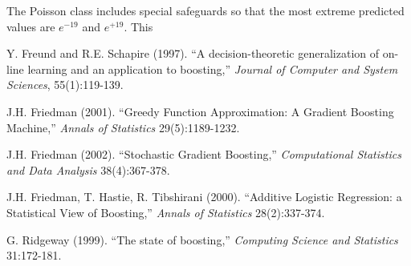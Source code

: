 \documentclass{article}
\begin{document}
The Poisson class includes special safeguards so that the most extreme predicted values are $e^{-19}$ and $e^{+19}$. This

\begin{thebibliography}{77}     %

\small                          %

Y. Freund and R.E. Schapire (1997). ``A decision-theoretic generalization of
on-line learning and an application to boosting,'' \textit{Journal of Computer and System Sciences}, 55(1):119-139.

J.H. Friedman (2001). ``Greedy Function Approximation: A Gradient Boosting
Machine,'' \textit{Annals of Statistics} 29(5):1189-1232.

J.H. Friedman (2002). ``Stochastic Gradient Boosting,'' \textit{Computational Statistics
and Data Analysis} 38(4):367-378.

J.H. Friedman, T. Hastie, R. Tibshirani (2000). ``Additive Logistic Regression:
a Statistical View of Boosting,'' \textit{Annals of Statistics} 28(2):337-374.

G. Ridgeway (1999). ``The state of boosting,'' \textit{Computing Science and Statistics}
31:172-181.

\end{thebibliography}           %
\end{document}
